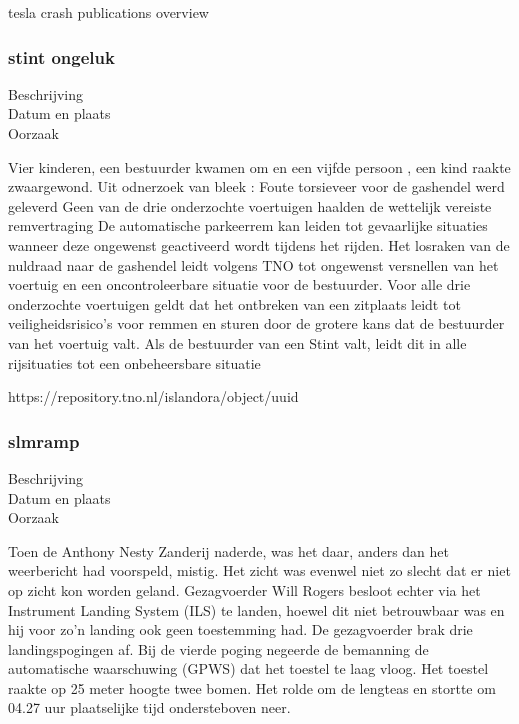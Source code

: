 tesla crash publications overview







\subsubsection{stint ongeluk}

\begin{description}
\item[Beschrijving]
\item[Datum en plaats] 
\item[Oorzaak]
\end{description}
Vier kinderen, een bestuurder kwamen om en een vijfde persoon , een kind raakte zwaargewond. Uit odnerzoek van bleek :
Foute torsieveer voor de gashendel werd geleverd
Geen van de drie onderzochte voertuigen haalden de wettelijk vereiste remvertraging
De automatische parkeerrem kan leiden tot gevaarlijke situaties wanneer deze ongewenst geactiveerd wordt tijdens het rijden. 
Het losraken van de nuldraad naar de gashendel leidt volgens TNO tot ongewenst versnellen van het voertuig en een oncontroleerbare situatie voor de bestuurder.
Voor alle drie onderzochte voertuigen geldt dat het ontbreken van een zitplaats leidt tot veiligheidsrisico’s voor remmen en sturen door de grotere kans dat de bestuurder van het voertuig valt. Als de bestuurder van een Stint valt, leidt dit in alle rijsituaties tot een onbeheersbare situatie


https://repository.tno.nl/islandora/object/uuid%



\subsubsection{slmramp}

\begin{description}
\item[Beschrijving]
\item[Datum en plaats] 
\item[Oorzaak]
\end{description}
Toen de Anthony Nesty Zanderij naderde, was het daar, anders dan het weerbericht had voorspeld, mistig. Het zicht was evenwel niet zo slecht dat er niet op zicht kon worden geland. Gezagvoerder Will Rogers besloot echter via het Instrument Landing System (ILS) te landen, hoewel dit niet betrouwbaar was en hij voor zo'n landing ook geen toestemming had. De gezagvoerder brak drie landingspogingen af. Bij de vierde poging negeerde de bemanning de automatische waarschuwing (GPWS) dat het toestel te laag vloog. Het toestel raakte op 25 meter hoogte twee bomen. Het rolde om de lengteas en stortte om 04.27 uur plaatselijke tijd ondersteboven neer.

